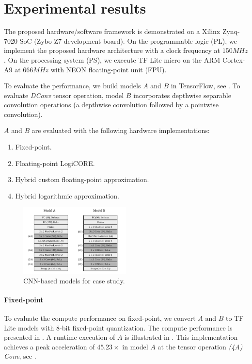 \section{Experimental results}
\label{sec:experimental_results}
The proposed hardware/software framework is demonstrated on a Xilinx Zynq-7020 SoC (Zybo-Z7 development board). On the programmable logic (PL), we implement the proposed hardware architecture with a clock frequency at $150 MHz$. On the processing system (PS), we execute TF Lite micro on the ARM Cortex-A9 at $666MHz$ with NEON floating-point unit (FPU)\cite{xilinx2015zynq}.

To evaluate the performance, we build models $A$ and $B$ in TensorFlow, see . To evaluate \emph{DConv} tensor operation, model $B$ incorporates depthwise separable convolution operations (a depthwise convolution followed by
a pointwise convolution).

$A$ and $B$ are evaluated with the following hardware implementations:

\begin{enumerate}
	\item Fixed-point.
	\item Floating-point LogiCORE.
	\item Hybrid custom floating-point approximation.
	\item Hybrid logarithmic approximation.
\end{enumerate}


\begin{figure}[t!]
	\centering
	\includegraphics[width=0.5\textwidth]{../figures/models.pdf}
	\caption{CNN-based models for case study.}
	\label{fig:models}
\end{figure}

\paragraph{Fixed-point}
To evaluate the compute performance on fixed-point, we convert $A$ and $B$ to TF Lite models with 8-bit fixed-point quantization. The compute performance is presented in . A runtime execution of $A$ is illustrated in . This implementation achieves a peak acceleration of $45.23\times$ in model $A$ at the tensor operation \emph{(4A) Conv}, see .

